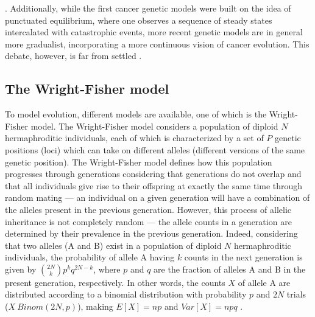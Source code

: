 \cite{Cannataro2018-ye,Schwartz2017-hg}. Additionally, while the first cancer genetic models were built on the idea of punctuated equilibrium, where one observes a sequence of steady states intercalated with catastrophic events, more recent genetic models are in general more gradualist, incorporating a more continuous vision of cancer evolution. This debate, however, is far from settled \cite{Beerenwinkel2015-xr,Sterelny2007-kp}. 

\subsection{The Wright-Fisher model}

To model evolution, different models are available, one of which is the Wright-Fisher model. The Wright-Fisher model considers a population of diploid $N$ hermaphroditic individuals, each of which is characterized by a set of $P$ genetic positions (loci) which can take on different alleles (different versions of the same genetic position). The Wright-Fisher model defines how this population progresses through generations considering that generations do not overlap and that all individuals give rise to their offspring at exactly the same time through random mating --- an individual on a given generation will have a combination of the alleles present in the previous generation. However, this process of allelic inheritance is not completely random --- the allele counts in a generation are determined by their prevalence in the previous generation. Indeed, considering that two alleles (A and B) exist in a population of diploid $N$ hermaphroditic individuals, the probability of allele A having $k$ counts in the next generation is given by $\binom{2N}{k}p^kq^{2N-k}$, where $p$ and $q$ are the fraction of alleles A and B in the present generation, respectively. In other words, the counts $X$ of allele A are distributed according to a binomial distribution with probability $p$ and $2N$ trials ($X~Binom(2N,p)$), making $E[X] = np$ and $Var[X] = npq$ \cite{Gillespie2004-xo}. 
